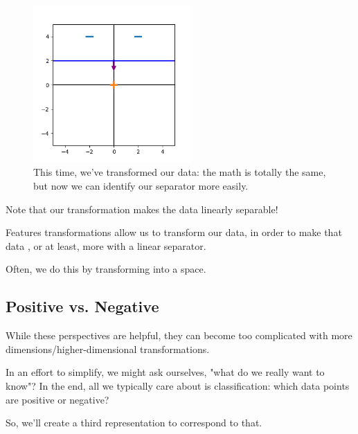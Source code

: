             \begin{figure}[H]
                \centering
                \includegraphics[width=60mm,scale=0.5]{images/feature_images/nonlinear_data.png}
                \caption*{This time, we've transformed our data: the math is totally the same, but now we can identify our separator more easily.}
            \end{figure}
    
            Note that our transformation makes the data linearly separable!\\
    
            \begin{concept}
                Features transformations allow us to  transform our data, in order to make that data , or at least, more  with a linear separator.
    
                Often, we do this by transforming into a  space.
            \end{concept}
    
            \subsecdiv

        \subsection{Positive vs. Negative}

            While these perspectives are helpful, they can become too complicated with more dimensions/higher-dimensional transformations.

            In an effort to simplify, we might ask ourselves, "what do we really want to know"? In the end, all we typically care about is classification: which data points are positive or negative?

            So, we'll create a third representation to correspond to that.\\

